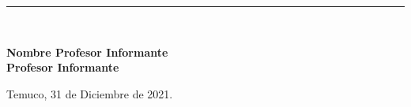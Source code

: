 \begin{titlepage}
{\begin{center}
\vspace*{0.5in}

\begin{flushright}
 \rule{65mm}{0.2mm}\\
\end{flushright}
\vspace*{-0.2in}
 \hspace*{3.5in} \textbf{Nombre Profesor Informante} \\
 \hspace*{3.5in} \textbf{Profesor Informante}

\vspace*{0.6in}

\begin{flushleft}
Temuco, 31 de Diciembre de 2021.
\end{flushleft}

\end{center}
}
\end{titlepage}
